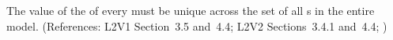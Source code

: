 The value of the   of every \UnitDefinition must be
unique across the set of all \UnitDefinition{}s in the entire
model.  (References: L2V1 Section~3.5 and~4.4; L2V2 Sections~3.4.1 and~4.4;
)
